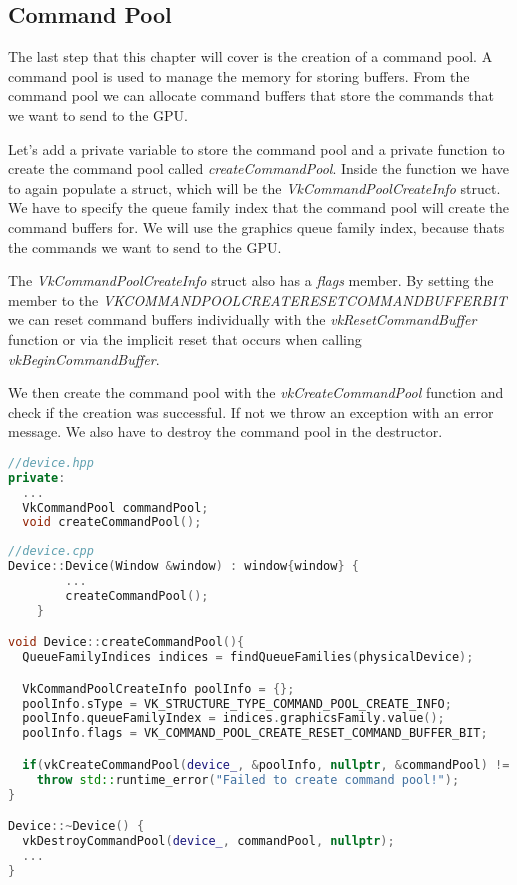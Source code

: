 \documentclass[12pt]{report} \usepackage{preamble}
\begin{document}
\subsection{Command Pool}

The last step that this chapter will cover is the creation of a command pool. A command pool is used
to manage the memory for storing buffers. From the command pool we can allocate command buffers that
store the commands that we want to send to the GPU.

Let's add a private variable to store the command pool and a private function to create the command pool
called \textit{createCommandPool}. Inside the function we have to again populate a struct, which will be
the \textit{VkCommandPoolCreateInfo} struct. We have to specify the queue family index that the command pool
will create the command buffers for. We will use the graphics queue family index, because thats the commands
we want to send to the GPU.

The \textit{VkCommandPoolCreateInfo} struct also has a \textit{flags} member. By setting the
member to the
\textit{VK\textunderscore COMMAND\textunderscore POOL\textunderscore CREATE\textunderscore RESET\textunderscore COMMAND\textunderscore BUFFER\textunderscore BIT}
we can reset command buffers individually with the \textit{vkResetCommandBuffer} function or via the implicit
reset that occurs when calling \textit{vkBeginCommandBuffer}.

We then create the command pool with the \textit{vkCreateCommandPool} function and check if the creation
was successful. If not we throw an exception with an error message. We also have to destroy the command pool
in the destructor.

\begin{lstlisting}[language=C++]
//device.hpp
private:
  ...
  VkCommandPool commandPool;
  void createCommandPool();
\end{lstlisting}

\begin{lstlisting}[language=C++]
//device.cpp
Device::Device(Window &window) : window{window} {
		...
		createCommandPool();
	}

void Device::createCommandPool(){
  QueueFamilyIndices indices = findQueueFamilies(physicalDevice);

  VkCommandPoolCreateInfo poolInfo = {};
  poolInfo.sType = VK_STRUCTURE_TYPE_COMMAND_POOL_CREATE_INFO;
  poolInfo.queueFamilyIndex = indices.graphicsFamily.value();
  poolInfo.flags = VK_COMMAND_POOL_CREATE_RESET_COMMAND_BUFFER_BIT;

  if(vkCreateCommandPool(device_, &poolInfo, nullptr, &commandPool) != VK_SUCCESS)
    throw std::runtime_error("Failed to create command pool!");
}

Device::~Device() {
  vkDestroyCommandPool(device_, commandPool, nullptr);
  ...
}
\end{lstlisting}
\end{document}

